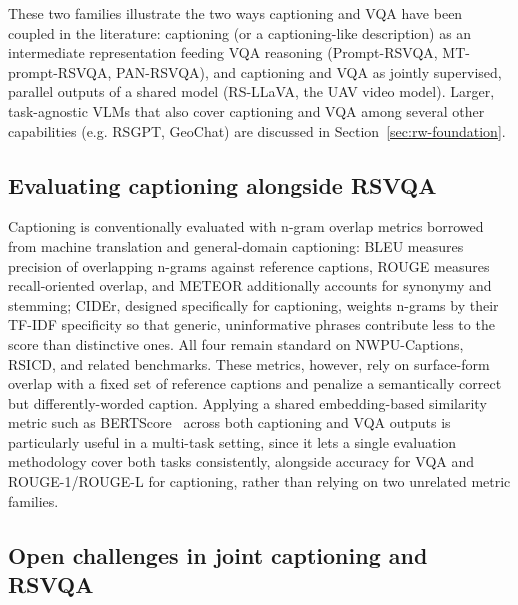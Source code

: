 These two families illustrate the two ways captioning and VQA have been coupled in the literature: captioning (or a captioning-like description) as an intermediate representation feeding VQA reasoning (Prompt-RSVQA, MT-prompt-RSVQA, PAN-RSVQA), and captioning and VQA as jointly supervised, parallel outputs of a shared model (RS-LLaVA, the UAV video model). Larger, task-agnostic VLMs that also cover captioning and VQA among several other capabilities (e.g. RSGPT, GeoChat) are discussed in Section~\ref{sec:rw-foundation}.

\subsection{Evaluating captioning alongside RSVQA}
\label{sec:rw-captioning-metrics}

Captioning is conventionally evaluated with n-gram overlap metrics borrowed from machine translation and general-domain captioning: BLEU measures precision of overlapping n-grams against reference captions, ROUGE measures recall-oriented overlap, and METEOR additionally accounts for synonymy and stemming; CIDEr, designed specifically for captioning, weights n-grams by their TF-IDF specificity so that generic, uninformative phrases contribute less to the score than distinctive ones. All four remain standard on NWPU-Captions, RSICD, and related benchmarks. These metrics, however, rely on surface-form overlap with a fixed set of reference captions and penalize a semantically correct but differently-worded caption. Applying a shared embedding-based similarity metric such as BERTScore~\cite{zhang2020bertscoreevaluatingtextgeneration} across both captioning and VQA outputs is particularly useful in a multi-task setting, since it lets a single evaluation methodology cover both tasks consistently, alongside accuracy for VQA and ROUGE-1/ROUGE-L for captioning, rather than relying on two unrelated metric families.

\subsection{Open challenges in joint captioning and RSVQA}
\label{sec:rw-captioning-challenges}

